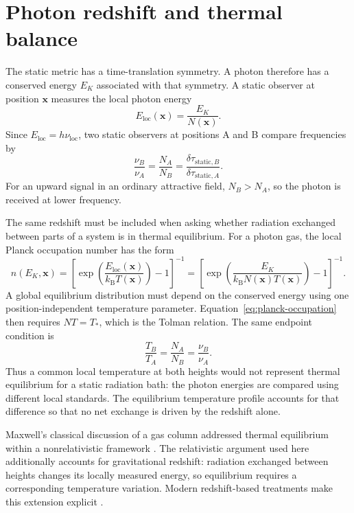 \documentclass[12pt]{article}
\begin{document}
\section{Photon redshift and thermal balance}

The static metric has a time-translation symmetry. A photon therefore has a conserved energy $E_K$ associated with that symmetry. A static observer at position $\mathbf{x}$ measures the local photon energy
\begin{equation}
  E_{\mathrm{loc}}(\mathbf{x})=\frac{E_K}{N(\mathbf{x})}.
  \label{eq:local-photon-energy}
\end{equation}
Since $E_{\mathrm{loc}}=h\nu_{\mathrm{loc}}$, two static observers at positions A and B compare frequencies by
\begin{equation}
  \frac{\nu_B}{\nu_A}
  =\frac{N_A}{N_B}
  =\frac{\delta\tau_{\mathrm{static},B}}
         {\delta\tau_{\mathrm{static},A}}.
  \label{eq:photon-frequency-ratio}
\end{equation}
For an upward signal in an ordinary attractive field, $N_B>N_A$, so the photon is received at lower frequency.

The same redshift must be included when asking whether radiation exchanged between parts of a system is in thermal equilibrium. For a photon gas, the local Planck occupation number has the form
\begin{equation}
  n(E_K,\mathbf{x})
  =\left[\exp\!\left(
    \frac{E_{\mathrm{loc}}(\mathbf{x})}{k_{\mathrm{B}}T(\mathbf{x})}
  \right)-1\right]^{-1}
  =\left[\exp\!\left(
    \frac{E_K}{k_{\mathrm{B}}N(\mathbf{x})T(\mathbf{x})}
  \right)-1\right]^{-1}.
  \label{eq:planck-occupation}
\end{equation}
A global equilibrium distribution must depend on the conserved energy using one position-independent temperature parameter. Equation~\eqref{eq:planck-occupation} then requires $N T=T_*$, which is the Tolman relation. The same endpoint condition is
\begin{equation}
  \frac{T_B}{T_A}
  =\frac{N_A}{N_B}
  =\frac{\nu_B}{\nu_A}.
  \label{eq:endpoint-temperature-ratio}
\end{equation}
Thus a common local temperature at both heights would not represent thermal equilibrium for a static radiation bath: the photon energies are compared using different local standards. The equilibrium temperature profile accounts for that difference so that no net exchange is driven by the redshift alone.

Maxwell's classical discussion of a gas column addressed thermal equilibrium within a nonrelativistic framework \cite{Maxwell1873}. The relativistic argument used here additionally accounts for gravitational redshift: radiation exchanged between heights changes its locally measured energy, so equilibrium requires a corresponding temperature variation. Modern redshift-based treatments make this extension explicit \cite{SantiagoVisserRedshift}.
\end{document}
